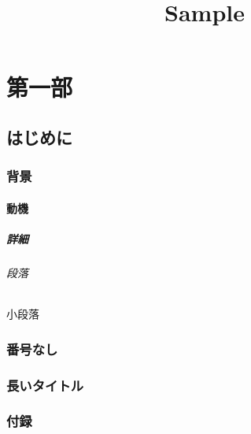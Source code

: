 \documentclass{article}
\title{Sample}
\begin{document}
\part{第一部}
\chapter{はじめに}
\section{背景}
\subsection{動機}
\subsubsection{詳細}
\paragraph{段落}
\subparagraph{小段落}
\section*{番号なし}
\section[短い]{長いタイトル}
\appendix
\section{付録}
\end{document}
